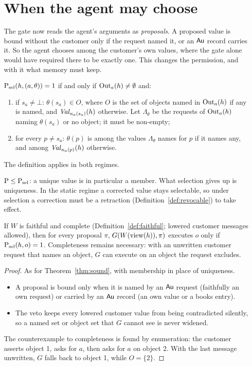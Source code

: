\section{When the agent may choose}\label{sec:selection}

The gate now reads the agent's arguments as \emph{proposals}. A proposed value is bound without the
customer only if the request named it, or an $\mathsf{Au}$ record carries it. So the agent chooses among the
customer's own values, where the gate alone would have required there to be exactly one. This
changes the permission, and with it what memory must keep.

\begin{definition}\label{def:selection}
$\mathrm{P}_{\mathrm{sel}}(h, (a, \theta)) = 1$ if and only if $\mathrm{Out}_a(h) \neq \emptyset$ and:
\begin{enumerate}
\item[(ii')] if $s_a \neq \bot$: $\theta(s_a) \in O$, where $O$ is the set of objects named in
  $\mathrm{Out}_a(h)$ if any is named, and $\mathit{Val}_{\kappa_a(s_a)}(h)$ otherwise. Let $\Lambda_\theta$ be the
  requests of $\mathrm{Out}_a(h)$ naming $\theta(s_a)$ or no object; it must be non-empty;
\item[(iii')] for every $p \neq s_a$: $\theta(p)$ is among the values $\Lambda_\theta$ names for $p$ if it
  names any, and among $\mathit{Val}_{\kappa_a(p)}(h)$ otherwise.
\end{enumerate}
The definition applies in both regimes.
\end{definition}

$\mathrm{P} \le \mathrm{P}_{\mathrm{sel}}$: a unique value is in particular a member. What selection gives up
is uniqueness. In the static regime a corrected value stays selectable, so under selection a
correction must be a retraction (Definition~\ref{def:revocable}) to take effect.

\begin{proposition}\label{prop:gate-selection}
If $W$ is faithful and complete (Definition~\ref{def:faithful}; lowered customer messages allowed),
then for every proposal $\pi$, $G(W(\mathrm{view}(h)), \pi)$ executes $o$ only if
$\mathrm{P}_{\mathrm{sel}}(h, o) = 1$. Completeness remains necessary: with an unwritten customer
request that names an object, $G$ can execute on an object the request excludes.
\end{proposition}
\begin{proof}
As for Theorem~\ref{thm:sound}, with membership in place of uniqueness.
\begin{itemize}
\item A proposal is bound only when it is named by an $\mathsf{Au}$ request (faithfully an own request) or
  carried by an $\mathsf{Au}$ record (an own value or a books entry).
\item The veto keeps every lowered customer value from being contradicted silently, so a named set
  or object set that $G$ cannot see is never widened.
\end{itemize}
The counterexample to completeness is found by enumeration: the customer asserts object 1, asks for
$a$, then asks for $a$ on object 2. With the last message unwritten, $G$ falls back to object 1,
while $O = \{2\}$.
\end{proof}

